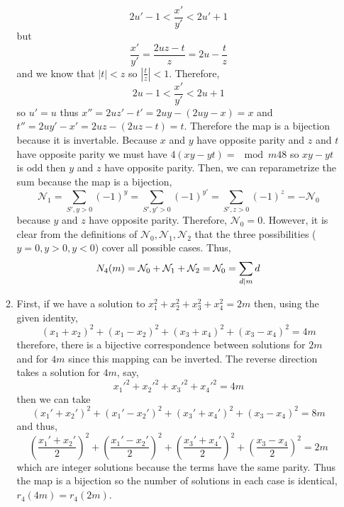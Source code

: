 \documentclass[12pt]{extarticle}
\begin{document}
\begin{enumerate}
\begin{enumerate}
\[ 2 u' - 1 < \frac{x'}{y'} < 2 u' + 1\]
but \[\frac{x'}{y'} = \frac{2uz - t}{z} = 2u - \frac{t}{z}\] 
and we know that $|t| < z$ so $|\frac{t}{z}| < 1$.
Therefore, \[2u - 1 < \frac{x'}{y'} < 2u + 1\]
so $u' = u$ thus $x'' = 2 u z' - t' = 2uy - (2uy - x) = x$ and $t'' = 2uy' - x' = 2uz - (2 u z - t) = t$. Therefore the map is a bijection because it is invertable. Because $x$ and $y$ have opposite parity and $z$ and $t$ have opposite parity we must have $4(xy - yt) = \mod{m}{4}{8}$ so $xy - yt$ is odd then $y$ and $z$ have opposite parity. Then, we can reparametrize the sum because the map is a bijection,
\[\mathcal{N}_1 = \sum_{S', y > 0} (-1)^y = \sum_{S', y' > 0} (-1)^{y'} = \sum_{S', z > 0} (-1)^{z} = - \mathcal{N}_0 \]
because $y$ and $z$ have opposite parity. Therefore, $\mathcal{N}_0 = 0$. However, it is clear from the definitions of $\mathcal{N}_0, \mathcal{N}_1, \mathcal{N}_2$ that the three possibilities ($y = 0, y > 0, y < 0$) cover all possible cases. Thus, \[N_4(m) = \mathcal{N}_0 + \mathcal{N}_1 + \mathcal{N}_2 = \mathcal{N}_0 = \sum_{d \mid m} d\]      
 
\item First, if we have a solution to $x_1^2 + x_2^2 + x_3^2 + x_4^2 = 2m$ then, using the given identity,
\[(x_1 + x_2)^2 + (x_1 - x_2)^2 + (x_3 + x_4)^2 + (x_3 - x_4)^2 = 4m\]
therefore, there is a bijective correspondence between solutions for $2m$ and for $4m$ since this mapping can be inverted. The reverse direction takes a solution for $4m$, say,
\[{x_1'}^2 + {x_2'}^2 + {x_3'}^2 + {x_4'}^2 = 4m \] then we can take 
\[(x_1' + x_2')^2 + (x_1' - x_2')^2 + (x_3' + x_4')^2 + (x_3 - x_4)^2 = 8m \] 
and thus,
\[\left(\frac{x_1' + x_2'}{2}\right)^2 + \left(\frac{x_1' - x_2'}{2} \right)^2 + \left(\frac{x_3' + x_4'}{2}\right)^2 + \left(\frac{x_3 - x_4}{2}\right)^2 = 2m \]
which are integer solutions because the terms have the same parity. Thus the map is a bijection so the number of solutions in each case is identical, $r_4(4m) = r_4(2m)$. \\ 


\end{enumerate}
\end{enumerate}
\end{document}
